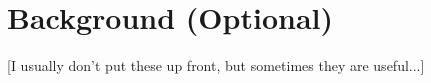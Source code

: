 \section{Background (Optional)}
\label{SEC:background}

[I usually don't put these up front, but sometimes they are useful...]
